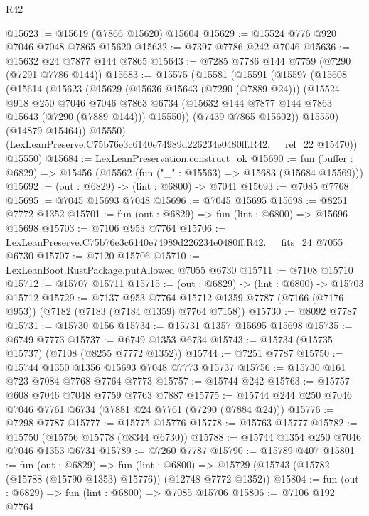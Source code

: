 \begin{lexlean}{R42}
\begin{coremodule}
{@15623 := @15619 (@7866 @15620) @15604
@15629 := @15524 @776 @920 @7046 @7048 @7865 @15620
@15632 := @7397 @7786 @242 @7046
@15636 := @15632 @24 @7877 @144 @7865
@15643 := @7285 @7786 @144 @7759 (@7290 (@7291 @7786 @144))
@15683 := @15575
    (@15581
      (@15591
        (@15597
          (@15608
            (@15614
              (@15623
                (@15629
                  (@15636 @15643 (@7290 (@7889 @24)))
                  (@15524
                    @918
                    @250
                    @7046
                    @7046
                    @7863
                    @6734
                    (@15632 @144 @7877 @144 @7863 @15643 (@7290 (@7889 @144)))
                    @15550))
                (@7439 @7865 @15602))
              @15550)
            (@14879 @15464))
          @15550)
        (LexLeanPreserve.C75b76e3c6140e74989d226234e0480ff.R42.__rel_22 @15470))
      @15550)
@15684 := LexLeanPreservation.construct_ok
@15690 := fun (buffer : @6829) => @15456 (@15562 (fun ("_" : @15563) => @15683 (@15684 @15569)))
@15692 := (out : @6829) -> (lint : @6800) -> @7041
@15693 := @7085 @7768
@15695 := @7045 @15693 @7048
@15696 := @7045 @15695
@15698 := @8251 @7772 @1352
@15701 := fun (out : @6829) => fun (lint : @6800) => @15696 @15698
@15703 := @7106 @953 @7764
@15706 := LexLeanPreserve.C75b76e3c6140e74989d226234e0480ff.R42.__fits_24 @7055 @6730
@15707 := @7120 @15706
@15710 := LexLeanBoot.RustPackage.putAllowed @7055 @6730
@15711 := @7108 @15710
@15712 := @15707 @15711
@15715 := (out : @6829) -> (lint : @6800) -> @15703 @15712
@15729 := @7137
    @953
    @7764
    @15712
    @1359
    @7787
    (@7166 (@7176 @953))
    (@7182 (@7183 (@7184 @1359) @7764 @7158))
@15730 := @8092 @7787
@15731 := @15730 @156
@15734 := @15731 @1357 @15695 @15698
@15735 := @6749 @7773
@15737 := @6749 @1353 @6734
@15743 := @15734 (@15735 @15737) (@7108 (@8255 @7772 @1352))
@15744 := @7251 @7787
@15750 := @15744 @1350 @1356 @15693 @7048 @7773 @15737
@15756 := @15730 @161 @723 @7084 @7768 @7764 @7773
@15757 := @15744 @242
@15763 := @15757 @608 @7046 @7048 @7759 @7763 @7887
@15775 := @15744 @244 @250 @7046 @7046 @7761 @6734 (@7881 @24 @7761 (@7290 (@7884 @24)))
@15776 := @7298 @7787
@15777 := @15775 @15776
@15778 := @15763 @15777
@15782 := @15750 (@15756 @15778 (@8344 @6730))
@15788 := @15744 @1354 @250 @7046 @7046 @1353 @6734
@15789 := @7260 @7787
@15790 := @15789 @407
@15801 := fun (out : @6829) =>
  fun (lint : @6800) => @15729 (@15743 (@15782 (@15788 (@15790 @1353) @15776)) (@12748 @7772 @1352))
@15804 := fun (out : @6829) => fun (lint : @6800) => @7085 @15706
@15806 := @7106 @192 @7764
}
\end{coremodule}
\end{lexlean}
